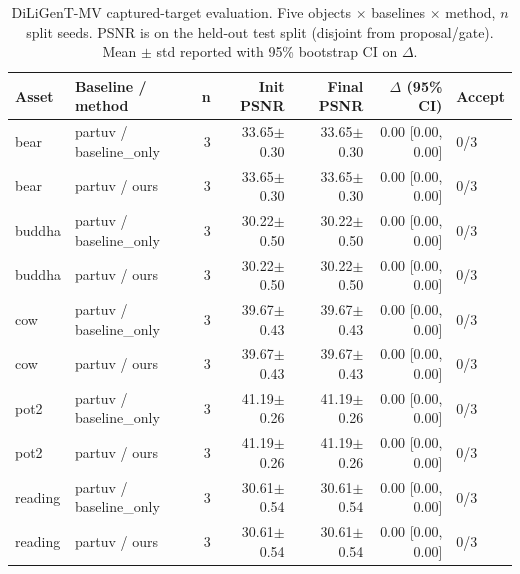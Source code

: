 \begin{table}[t]
\centering
\scriptsize
\caption{DiLiGenT-MV captured-target evaluation. Five objects $\times$ baselines $\times$ method, $n$ split seeds. PSNR is on the held-out test split (disjoint from proposal/gate). Mean $\pm$ std reported with 95\% bootstrap CI on $\Delta$.}
\label{tab:diligent_mv}
\begin{tabular}{@{}llrrrrl@{}}
\toprule
Asset & Baseline / method & n & Init PSNR & Final PSNR & $\Delta$ (95\% CI) & Accept \\
\midrule
bear & partuv / baseline\_only & 3 & 33.65$\pm$0.30 & 33.65$\pm$0.30 & 0.00 [0.00, 0.00] & 0/3 \\
bear & partuv / ours & 3 & 33.65$\pm$0.30 & 33.65$\pm$0.30 & 0.00 [0.00, 0.00] & 0/3 \\
buddha & partuv / baseline\_only & 3 & 30.22$\pm$0.50 & 30.22$\pm$0.50 & 0.00 [0.00, 0.00] & 0/3 \\
buddha & partuv / ours & 3 & 30.22$\pm$0.50 & 30.22$\pm$0.50 & 0.00 [0.00, 0.00] & 0/3 \\
cow & partuv / baseline\_only & 3 & 39.67$\pm$0.43 & 39.67$\pm$0.43 & 0.00 [0.00, 0.00] & 0/3 \\
cow & partuv / ours & 3 & 39.67$\pm$0.43 & 39.67$\pm$0.43 & 0.00 [0.00, 0.00] & 0/3 \\
pot2 & partuv / baseline\_only & 3 & 41.19$\pm$0.26 & 41.19$\pm$0.26 & 0.00 [0.00, 0.00] & 0/3 \\
pot2 & partuv / ours & 3 & 41.19$\pm$0.26 & 41.19$\pm$0.26 & 0.00 [0.00, 0.00] & 0/3 \\
reading & partuv / baseline\_only & 3 & 30.61$\pm$0.54 & 30.61$\pm$0.54 & 0.00 [0.00, 0.00] & 0/3 \\
reading & partuv / ours & 3 & 30.61$\pm$0.54 & 30.61$\pm$0.54 & 0.00 [0.00, 0.00] & 0/3 \\
\bottomrule
\end{tabular}
\end{table}
